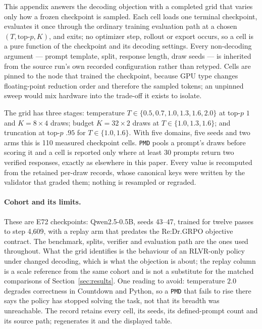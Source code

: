 \documentclass{article}
\newcommand{\1}{\mathbf 1}
\newcommand{\pmd}{\texttt{PMD}}
\theoremstyle{remark}
\theoremstyle{definition}
\theoremstyle{plain}
\begin{document}
This appendix answers the decoding objection with a completed
grid that varies only how a frozen checkpoint is sampled. Each cell loads one
terminal checkpoint, evaluates it once through the ordinary training evaluation
path at a chosen $(T,\text{top-}p,K)$, and exits; no optimizer step, rollout or
export occurs, so a cell is a pure function of the checkpoint and its decoding
settings. Every non-decoding argument --- prompt template, split, response
length, draw seeds --- is inherited from the source run's own recorded
configuration rather than retyped. Cells are pinned to the node that trained
the checkpoint, because GPU type changes floating-point reduction order and
therefore the sampled tokens; an unpinned sweep would mix hardware into the
trade-off it exists to isolate.

The grid has three stages: temperature $T\in\{0.5,0.7,1.0,1.3,1.6,2.0\}$ at
top-$p$ $1$ and $K=8\times4$ draws; budget $K=32\times2$ draws at
$T\in\{1.0,1.3,1.6\}$; and truncation at top-$p$ $.95$ for $T\in\{1.0,1.6\}$.
With five domains, five seeds and two arms this is 110 measured checkpoint
cells. \pmd{} pools a prompt's draws before scoring it and a cell is reported
only where at least 30 prompts return two verified responses, exactly as
elsewhere in this paper. Every value is recomputed from the retained per-draw
records, whose canonical keys were written by the validator that graded them;
nothing is resampled or regraded.

\paragraph{Cohort and its limits.}
These are E72 checkpoints: Qwen2.5-0.5B, seeds 43--47, trained for twelve
passes to step 4,609, with a replay arm that predates the Re:Dr.GRPO objective
contract. The benchmark, splits, verifier and evaluation path are the ones used
throughout. What the grid identifies is the behaviour of an RLVR-only
policy under changed decoding, which is what the objection is about; the
replay column is a scale reference from the same cohort and is not a substitute
for the matched comparisons of Section~\ref{sec:results}. One reading to avoid:
temperature $2.0$ degrades correctness in Countdown and Python, so a \pmd{}
that fails to rise there says the policy has stopped solving the task, not that
its breadth was unreachable. The record
 retains every cell, its seeds,
its defined-prompt count and its source path;
 regenerates it and the displayed
table.
\end{document}
